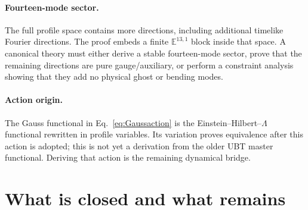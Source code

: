 \documentclass[11pt,a4paper]{article}
\theoremstyle{remark}
\begin{document}
\paragraph{Fourteen-mode sector.}
The full profile space contains more directions, including additional
timelike Fourier directions.  The proof embeds a finite
$\mathbb E^{13,1}$ block inside that space.  A canonical theory must either
derive a stable fourteen-mode sector, prove that the remaining directions are
pure gauge/auxiliary, or perform a constraint analysis showing that they add
no physical ghost or bending modes.

\paragraph{Action origin.}
The Gauss functional in Eq.~\eqref{eq:Gaussaction} is the
Einstein--Hilbert--$\Lambda$ functional rewritten in profile variables.  Its
variation proves equivalence after this action is adopted; this is not yet a
derivation from the older UBT master functional.  Deriving that action is the
remaining dynamical bridge.

\section{What is closed and what remains}
\end{document}
